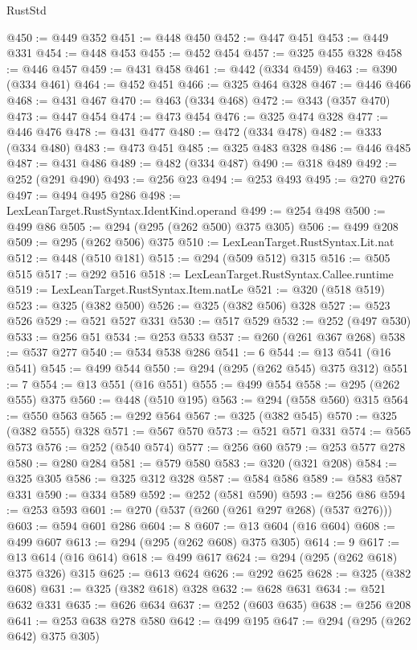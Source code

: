 \begin{lexlean}{RustStd}
\begin{coremodule}
@450 := @449 @352
@451 := @448 @450
@452 := @447 @451
@453 := @449 @331
@454 := @448 @453
@455 := @452 @454
@457 := @325 @455 @328
@458 := @446 @457
@459 := @431 @458
@461 := @442 (@334 @459)
@463 := @390 (@334 @461)
@464 := @452 @451
@466 := @325 @464 @328
@467 := @446 @466
@468 := @431 @467
@470 := @463 (@334 @468)
@472 := @343 (@357 @470)
@473 := @447 @454
@474 := @473 @454
@476 := @325 @474 @328
@477 := @446 @476
@478 := @431 @477
@480 := @472 (@334 @478)
@482 := @333 (@334 @480)
@483 := @473 @451
@485 := @325 @483 @328
@486 := @446 @485
@487 := @431 @486
@489 := @482 (@334 @487)
@490 := @318 @489
@492 := @252 (@291 @490)
@493 := @256 @23
@494 := @253 @493
@495 := @270 @276
@497 := @494 @495 @286
@498 := LexLeanTarget.RustSyntax.IdentKind.operand
@499 := @254 @498
@500 := @499 @86
@505 := @294 (@295 (@262 @500) @375 @305)
@506 := @499 @208
@509 := @295 (@262 @506) @375
@510 := LexLeanTarget.RustSyntax.Lit.nat
@512 := @448 (@510 @181)
@515 := @294 (@509 @512) @315
@516 := @505 @515
@517 := @292 @516
@518 := LexLeanTarget.RustSyntax.Callee.runtime
@519 := LexLeanTarget.RustSyntax.Item.natLe
@521 := @320 (@518 @519)
@523 := @325 (@382 @500)
@526 := @325 (@382 @506) @328
@527 := @523 @526
@529 := @521 @527 @331
@530 := @517 @529
@532 := @252 (@497 @530)
@533 := @256 @51
@534 := @253 @533
@537 := @260 (@261 @367 @268)
@538 := @537 @277
@540 := @534 @538 @286
@541 := 6
@544 := @13 @541 (@16 @541)
@545 := @499 @544
@550 := @294 (@295 (@262 @545) @375 @312)
@551 := 7
@554 := @13 @551 (@16 @551)
@555 := @499 @554
@558 := @295 (@262 @555) @375
@560 := @448 (@510 @195)
@563 := @294 (@558 @560) @315
@564 := @550 @563
@565 := @292 @564
@567 := @325 (@382 @545)
@570 := @325 (@382 @555) @328
@571 := @567 @570
@573 := @521 @571 @331
@574 := @565 @573
@576 := @252 (@540 @574)
@577 := @256 @60
@579 := @253 @577 @278
@580 := @280 @284
@581 := @579 @580
@583 := @320 (@321 @208)
@584 := @325 @305
@586 := @325 @312 @328
@587 := @584 @586
@589 := @583 @587 @331
@590 := @334 @589
@592 := @252 (@581 @590)
@593 := @256 @86
@594 := @253 @593
@601 := @270 (@537 (@260 (@261 @297 @268) (@537 @276)))
@603 := @594 @601 @286
@604 := 8
@607 := @13 @604 (@16 @604)
@608 := @499 @607
@613 := @294 (@295 (@262 @608) @375 @305)
@614 := 9
@617 := @13 @614 (@16 @614)
@618 := @499 @617
@624 := @294 (@295 (@262 @618) @375 @326) @315
@625 := @613 @624
@626 := @292 @625
@628 := @325 (@382 @608)
@631 := @325 (@382 @618) @328
@632 := @628 @631
@634 := @521 @632 @331
@635 := @626 @634
@637 := @252 (@603 @635)
@638 := @256 @208
@641 := @253 @638 @278 @580
@642 := @499 @195
@647 := @294 (@295 (@262 @642) @375 @305)

\end{coremodule}
\end{lexlean}
